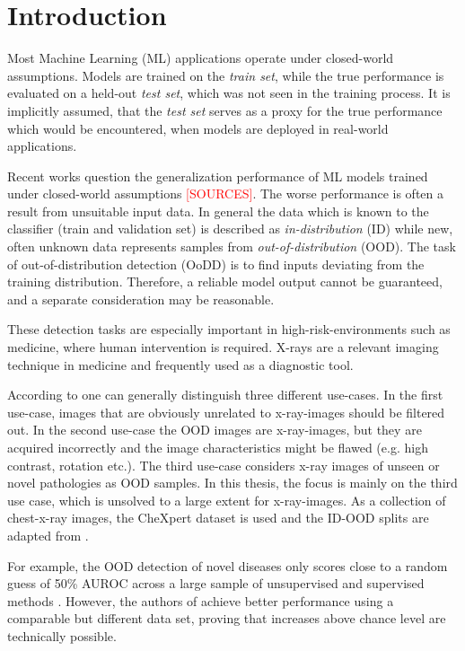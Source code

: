 \section{Introduction}
\raggedbottom
Most Machine Learning (ML) applications operate under closed-world assumptions.
Models are trained on the \textit{train set}, while the true performance is evaluated on a held-out \textit{test set}, which was not seen in the training process.
It is implicitly assumed, that the \textit{test set} serves as a proxy for the true performance which would be encountered, when models are deployed in real-world applications.
\par
Recent works question the generalization performance of ML models trained under closed-world assumptions \textcolor{red}{[SOURCES]}.
The worse performance is often a result from unsuitable input data.
In general the data which is known to the classifier (train and validation set) is described as \textit{in-distribution} (ID) while new, often unknown data represents samples from \textit{out-of-distribution} (OOD).
The task of out-of-distribution detection (OoDD) is to find inputs deviating from the training distribution.
Therefore, a reliable model output cannot be guaranteed, and a separate consideration may be reasonable.
\par
These detection tasks are especially important in high-risk-environments such as medicine, where human intervention is required.
X-rays are a relevant imaging technique in medicine and frequently used as a diagnostic tool.
\par
According to \citep{Cao2020} one can generally distinguish three different use-cases.
In the first use-case, images that are obviously unrelated to x-ray-images should be filtered out.
In the second use-case the OOD images are x-ray-images, but they are acquired incorrectly and the image characteristics might be flawed (e.g. high contrast, rotation etc.).
The third use-case considers x-ray images of unseen or novel pathologies as OOD samples.
In this thesis, the focus is mainly on the third use case, which is unsolved to a large extent for x-ray-images.
As a collection of chest-x-ray images, the CheXpert dataset is used \citep{Irvin2019} and the ID-OOD splits are adapted from \citep{Berger2021}.
\par
For example, the OOD detection of novel diseases only scores close to a random guess of 50\% AUROC across a large sample of unsupervised and supervised methods \citep{Cao2020}.
However, the authors of \citep{Berger2021} achieve better performance using a comparable but different data set, proving that increases above chance level are technically possible.
